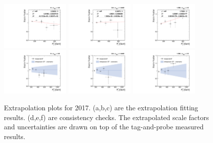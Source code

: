 \begin{figure}[!htbp]
  \centering
   \caption{Extrapolation plots for 2017. (a,b,c) are the extrapolation fitting results. (d,e,f) are consistency checks. The extrapolated scale factors and uncertainties are drawn on top of the tag-and-probe measured results.}
  \includegraphics[width=0.3\textwidth]{fig/Extrapolate_2017_0_Fit.pdf}
  \includegraphics[width=0.3\textwidth]{fig/Extrapolate_2017_1_Fit.pdf}
  \includegraphics[width=0.3\textwidth]{fig/Extrapolate_2017_2_Fit.pdf}\\
  \includegraphics[width=0.3\textwidth]{fig/Extrapolate_2017_0_Check.pdf}
  \includegraphics[width=0.3\textwidth]{fig/Extrapolate_2017_1_Check.pdf}
  \includegraphics[width=0.3\textwidth]{fig/Extrapolate_2017_2_Check.pdf}\\

\end{figure}
